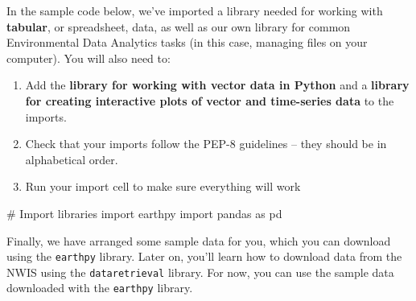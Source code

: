 \documentclass[
  letterpaper,
  DIV=11,
  numbers=noendperiod,
  oneside]{scrreprt}
\newenvironment{Shaded}{\begin{snugshade}}{\end{snugshade}}
\newcommand{\CommentTok}[1]{\textcolor[rgb]{0.37,0.37,0.37}{#1}}
\newcommand{\ImportTok}[1]{\textcolor[rgb]{0.00,0.46,0.62}{#1}}
\newcommand{\NormalTok}[1]{\textcolor[rgb]{0.00,0.23,0.31}{#1}}
\providecommand{\tightlist}{%
  \setlength{\itemsep}{0pt}\setlength{\parskip}{0pt}}
\begin{document}
\begin{tcolorbox}[enhanced jigsaw, colbacktitle=quarto-callout-color!10!white, opacityback=0, bottomtitle=1mm, toptitle=1mm, bottomrule=.15mm, left=2mm, colframe=quarto-callout-color-frame, leftrule=.75mm, opacitybacktitle=0.6, colback=white, rightrule=.15mm, toprule=.15mm, breakable, titlerule=0mm, title=\textcolor{quarto-callout-color}{\faInfo}\hspace{0.5em}{Try It}, coltitle=black, arc=.35mm]

In the sample code below, we've imported a library needed for working
with \textbf{tabular}, or spreadsheet, data, as well as our own library
for common Environmental Data Analytics tasks (in this case, managing
files on your computer). You will also need to:

\begin{enumerate}
\def\labelenumi{\arabic{enumi}.}
\tightlist
\item
  Add the \textbf{library for working with vector data in Python} and a
  \textbf{library for creating interactive plots of vector and
  time-series data} to the imports.
\item
  Check that your imports follow the PEP-8 guidelines -- they should be
  in alphabetical order.
\item
  Run your import cell to make sure everything will work
\end{enumerate}

\end{tcolorbox}

\begin{Shaded}
\begin{Highlighting}[]
\CommentTok{\# Import libraries}
\ImportTok{import}\NormalTok{ earthpy}
\ImportTok{import}\NormalTok{ pandas }\ImportTok{as}\NormalTok{ pd}
\end{Highlighting}
\end{Shaded}

Finally, we have arranged some sample data for you, which you can
download using the \texttt{earthpy} library. Later on, you'll learn how
to download data from the NWIS using the \texttt{dataretrieval} library.
For now, you can use the sample data downloaded with the
\texttt{earthpy} library.
\end{document}
